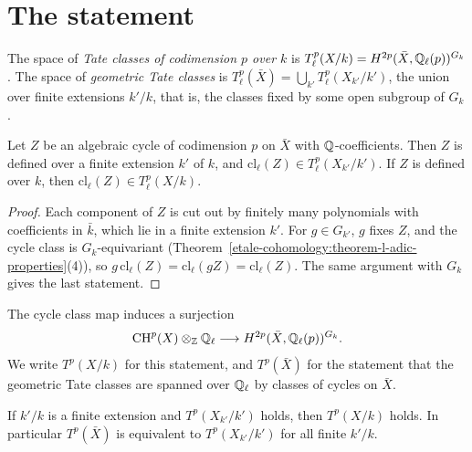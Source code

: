 \section{The statement}\label{tate-conjecture:section-statement}

\begin{definition}\label{tate-conjecture:definition-tate-classes}
The space of \emph{Tate classes of codimension $p$ over $k$} is $T^p_\ell(X/k) = H^{2p}(\bar X, \mathbb{Q}_\ell(p))^{G_k}$. The space of \emph{geometric Tate classes} is
$T^p_\ell(\bar X) = \bigcup_{k'}T^p_\ell(X_{k'}/k')$, the union over finite extensions $k'/k$, that is, the classes fixed by some open subgroup of $G_k$.
\end{definition}

\begin{lemma}\label{tate-conjecture:lemma-cycles-tate}
Let $Z$ be an algebraic cycle of codimension $p$ on $\bar X$ with $\mathbb{Q}$-coefficients. Then $Z$ is defined over a finite extension $k'$ of $k$, and $\mathrm{cl}_\ell(Z) \in T^p_\ell(X_{k'}/k')$. If $Z$ is defined
over $k$, then $\mathrm{cl}_\ell(Z) \in T^p_\ell(X/k)$.
\end{lemma}

\begin{proof}
Each component of $Z$ is cut out by finitely many polynomials with coefficients in $\bar k$, which lie in a finite extension $k'$. For $g \in G_{k'}$, $g$ fixes $Z$, and the cycle class is $G_k$-equivariant
(Theorem~\ref{etale-cohomology:theorem-l-adic-properties}(4)), so $g\,\mathrm{cl}_\ell(Z) = \mathrm{cl}_\ell(gZ) = \mathrm{cl}_\ell(Z)$. The same argument with $G_k$ gives the last statement.
\end{proof}

\begin{conjecture}[Tate]\label{tate-conjecture:conjecture-tate}
The cycle class map induces a surjection
\[
\operatorname{CH}^p(X) \otimes_{\mathbb{Z}}\mathbb{Q}_\ell \longrightarrow H^{2p}(\bar X, \mathbb{Q}_\ell(p))^{G_k}.
\]
We write $T^p(X/k)$ for this statement, and $T^p(\bar X)$ for the statement that the geometric Tate classes are spanned over $\mathbb{Q}_\ell$ by classes of cycles on $\bar X$.
\end{conjecture}

\begin{lemma}\label{tate-conjecture:lemma-descent}
If $k'/k$ is a finite extension and $T^p(X_{k'}/k')$ holds, then $T^p(X/k)$ holds. In particular $T^p(\bar X)$ is equivalent to $T^p(X_{k'}/k')$ for all finite $k'/k$.
\end{lemma}

